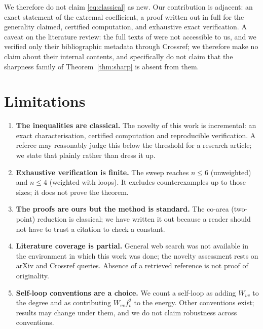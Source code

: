 \documentclass[11pt,a4paper]{article}
\theoremstyle{plain}
\theoremstyle{definition}
\begin{document}
We therefore do not claim \eqref{eq:classical} as new.  Our contribution is
adjacent: an exact statement of the extremal coefficient, a proof written out
in full for the generality claimed, certified computation, and exhaustive exact
verification.  A caveat on the literature review: the full texts of
\cite{mohar1988,mohar1989} were not accessible to us, and we verified only
their bibliographic metadata through Crossref; we therefore make no claim about
their internal contents, and specifically do not claim that the sharpness family
of Theorem~\ref{thm:sharp} is absent from them.

\section{Limitations}\label{sec:limits}

\begin{enumerate}[leftmargin=*,itemsep=2pt]
\item \textbf{The inequalities are classical.}  The novelty of this work is
      incremental: an exact characterisation, certified computation and
      reproducible verification.  A referee may reasonably judge this below the
      threshold for a research article; we state that plainly rather than
      dress it up.

\item \textbf{Exhaustive verification is finite.}  The sweep reaches
      $n\le 6$ (unweighted) and $n\le 4$ (weighted with loops).  It excludes
      counterexamples up to those sizes; it does not prove the theorem.

\item \textbf{The proofs are ours but the method is standard.}  The co-area
      (two-point) reduction is classical; we have written it out because a
      reader should not have to trust a citation to check a constant.

\item \textbf{Literature coverage is partial.}  General web search was not
      available in the environment in which this work was done; the novelty
      assessment rests on arXiv and Crossref queries.  Absence of a retrieved
      reference is not proof of originality.

\item \textbf{Self-loop conventions are a choice.}  We count a self-loop as
      adding $W_{vv}$ to the degree and as contributing $W_{vv}f_v^2$ to the
      energy.  Other conventions exist; results may change under them, and we
      do not claim robustness across conventions.
\end{enumerate}
\end{document}
